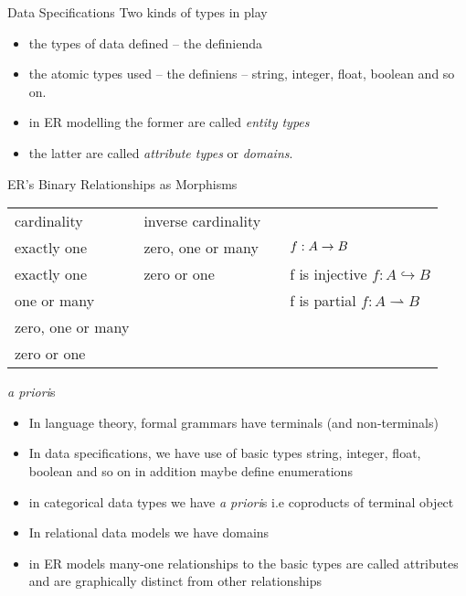 \documentclass[xcolor=pst,dvips]{beamer}   %
\begin{document}
\begin{frame}{Data Specifications}
Two kinds of types in play
\begin{itemize}
\item the types of data defined -- the definienda
\pause \item the atomic types used -- the definiens  -- string, integer, float, boolean and so on.
\pause \item in ER modelling the former are called \textit{entity types}
\pause \item the latter are called \textit{attribute types} or \textit{domains}.
\end{itemize}
\end{frame}

\begin{frame}{ER's Binary Relationships as Morphisms}
\footnotesize
\begin{tabular} {l l l l}
cardinality        & inverse cardinality &     &\\
exactly one        & zero, one or many   &     & $f: A \rightarrow B$\\
exactly one        & zero or one         &     & f is injective $f: A \hookrightarrow B$\\
one or many        &                     &     &f is partial $f:A \rightharpoonup B$\\
zero, one or many  &                     &     &\\
zero or one        &                     &     &\\
\end{tabular}
\end{frame}


\begin{frame}{\textit{a priori}s}
\begin{itemize}
\item In language theory, formal grammars have terminals (and non-terminals)
\pause \item In data specifications, we have use of basic types string, integer, float, boolean and so on
              in addition maybe define enumerations 
\pause \item in categorical data types we have \textit{a priori}s i.e coproducts of terminal object
\pause \item In relational data models we have domains
\pause \item in ER models many-one relationships to the basic types are called attributes and are graphically distinct from other relationships
\end{itemize}
\end{frame}
\end{document}

